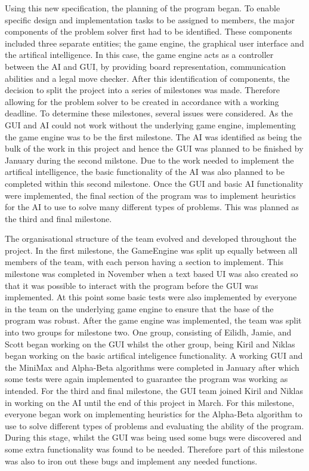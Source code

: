 \documentclass{l3proj}
\begin{document}
Using this new specification, the planning of the program began. To enable specific design and implementation tasks to be assigned to members, the major components of the problem solver first had to be identified. These components included three separate entities; the game engine, the graphical user interface and the artifical intelligence. In this case, the game engine acts as a controller between the AI and GUI, by providing board representation, communication abilities and a legal move checker. After this identification of components, the decision to split the project into a series of milestones was made. Therefore allowing for the problem solver to be created in accordance with a working deadline. To determine these milestones, several issues were considered. As the GUI and AI could not work without the underlying game engine, implementing the game engine was to be the first milestone. The AI was identified as being the bulk of the work in this project and hence the GUI was planned to be finished by January during the second milstone. Due to the work needed to implement the artifical intelligence, the basic functionality of the AI was also planned to be completed within this second milestone. Once the GUI and basic AI functionality were implemented, the final section of the program was to implement heuristics for the AI to use to solve many different types of problems.  This was planned as the third and final milestone.

The organisational structure of the team evolved and developed throughout the project. In the first milestone, the GameEngine was split up equally between all members of the team, with each person having a section to implement. This milestone was completed in November when a text based UI was also created so that it was possible to interact with the program before the GUI was implemented. At this point some basic tests were also implemented by everyone in the team on the underlying game engine to ensure that the base of the program was robust. After the game engine was implemented, the team was split into two groups for milestone two. One group, consisting of Eilidh, Jamie, and Scott began working on the GUI whilst the other group, being Kiril and Niklas began working on the basic artifical inteligence functionality.  A working GUI and the MiniMax and Alpha-Beta algorithms were completed in January after which some tests were again implemented to guarantee the program was working as intended. For the third and final milestone, the GUI team joined Kiril and Niklas in working on the AI until the end of this project in March.  For this milestone, everyone began work on implementing heuristics for the Alpha-Beta algorithm to use to solve different types of problems and evaluating the ability of the program. During this stage, whilst the GUI was being used some bugs were discovered and some extra functionality was found to be needed. Therefore part of this milestone was also to iron out these bugs and implement any needed functions.
\end{document}
